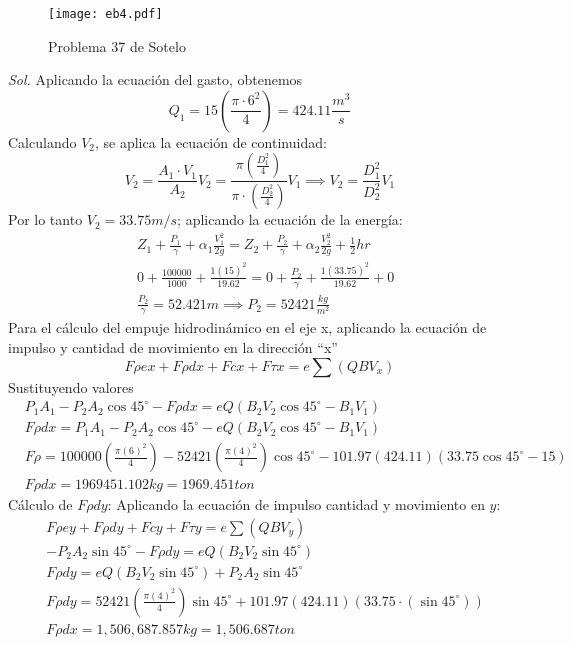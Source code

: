 \begin{figure}[h!]
    \centering
    \texttt{[image: eb4.pdf]}
    \caption{Problema 37 de Sotelo}
    \label{eb4}
\end{figure}
\textit{ Sol. }
Aplicando la ecuación del gasto, obtenemos
\begin{equation*}
    Q_1 =15\left(\frac{\pi\cdot 6^2}{4} \right) = 424.11 \frac{m^3}{s}
\end{equation*}
Calculando $V_2$,  se aplica la ecuación de continuidad:
\begin{equation*}
    V_2 = \frac{A_1 \cdot V_1}{A_2}V_2 = \frac{\pi\left(\frac{D_1^2}{4}\right)}{\pi \cdot \left(\frac{D_2^2}{4}\right)}V_1 \implies V_2 = \frac{D_1^2}{D_2^2}V_1
\end{equation*}
Por lo tanto $V_2=33.75m/s$; aplicando la ecuación de la energía:
\begin{align*}
    &Z_1 + \frac{P_1}{\gamma} +\alpha_1\frac{V_1^2}{2g} = Z_2 + \frac{P_2}{\gamma} +\alpha_2\frac{V^2_2}{2g} + \frac{1}{2}hr\\
    &0 + \frac{100000}{1000} + \frac{1(15)^2}{19.62} = 0 + \frac{P_2}{\gamma} + \frac{1\left(33.75\right)^2}{19.62} + 0\\
    &\frac{P_2}{\gamma} = 52.421m \implies P_2 = 52421 \frac{kg}{m^2}
\end{align*}
Para el cálculo del empuje hidrodinámico en el eje x, aplicando la ecuación de impulso y cantidad de movimiento en la dirección “x”
\begin{equation*}
    F\rho ex + F\rho dx + Fcx + F\tau x= e\sum\left(QBV_x\right)
\end{equation*}
Sustituyendo valores
\begin{align*}
    &P_1A_1 - P_2A_2 \cos{45^{\circ}} - F\rho dx = eQ\left(B_2V_2 \cos{45^{\circ}} - B_1 V_1 \right)\\
    &F\rho dx = P_1A_1 - P_2A_2 \cos{45^{\circ}} - eQ\left(B_2V_2 \cos{45^{\circ}} - B_1V_1  \right)\\
    &F\rho = 100000\left(\frac{\pi(6)^2}{4}\right) - 52421 \left(\frac{\pi(4)^2}{4}\right)\cos{45^{\circ}} - 101.97(424.11) \left(33.75 \cos{45^{\circ}} - 15\right)\\
    &F\rho dx = 1969451.102kg = 1969.451 ton
\end{align*}
Cálculo de $F\rho dy$: Aplicando la ecuación de impulso cantidad y movimiento en $y$:
\begin{align*}
    &F\rho ey + F\rho dy + Fcy + F\tau y = e\sum \left(QBV_y\right)\\
    &- P_2A_2\sin{45^{\circ}} - F\rho dy = eQ\left(B_2V_2 \sin{45^{\circ}}\right)\\
    &F\rho dy = eQ\left(B_2V_2\sin{45^{\circ}} \right) + P_2A_2\sin{45^{\circ}}\\
    &F\rho dy = 52421\left(\frac{\pi(4)^2}{4}\right) \sin{45^{\circ}} + 101.97(424.11)\left(33.75 \cdot (\sin{45^{\circ}} )\right)\\
    &F\rho dx = 1,506,687.857kg = 1,506.687 ton
\end{align*}
